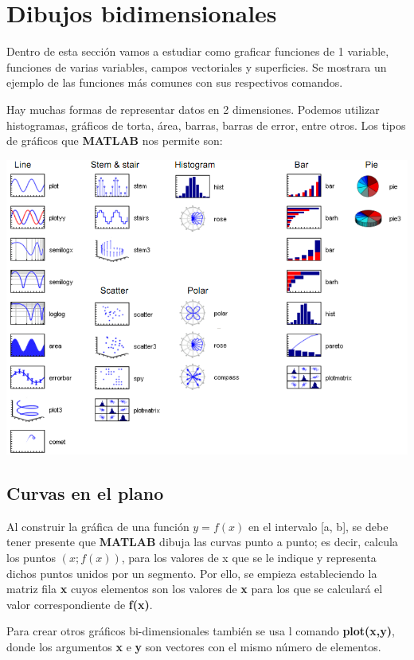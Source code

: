 \chapter{Dibujos bidimensionales}

Dentro de esta sección vamos a estudiar como graficar funciones de 1 variable, funciones de varias variables, campos vectoriales y superficies. Se mostrara un ejemplo de las funciones más comunes con sus respectivos comandos.

Hay muchas formas de representar datos en 2 dimensiones. Podemos utilizar histogramas, gráficos de torta, área, barras, barras de error, entre otros. Los tipos de gráficos que \textbf{MATLAB} nos permite son:
\begin{center}
\includegraphics[width=450pt]{./Imagenes/graficos2d.png}
\end{center}

\section{Curvas en el plano}

Al construir la gráfica de una función $y=f(x)$ en el intervalo [a, b], se debe tener presente que \textbf{MATLAB} dibuja las curvas punto a punto; es decir, calcula los puntos $(x; f(x))$, para los valores de x que se le indique y representa dichos puntos unidos por un segmento. Por ello, se empieza estableciendo la matriz fila \textbf{x} cuyos elementos son los valores de \textbf{x} para los que se calculará el valor correspondiente de \textbf{f(x)}.

Para crear otros gráficos bi-dimensionales también se usa l comando \textbf{plot(x,y)}, donde los argumentos \textbf{x} e \textbf{y} son vectores con el mismo número de elementos.

